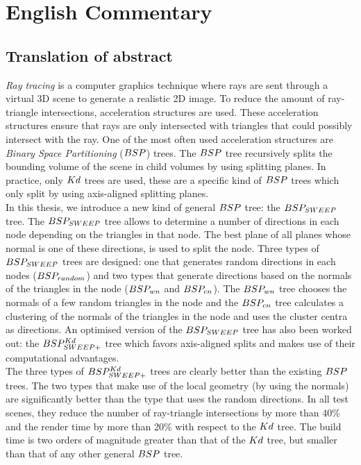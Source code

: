 \chapter{English Commentary}

\section{Translation of abstract}
\textit{Ray tracing} is a computer graphics technique where rays are sent through a virtual 3D scene to generate a realistic 2D image.
To reduce the amount of ray-triangle intersections, acceleration structures are used.
These acceleration structures ensure that rays are only intersected with triangles that could possibly intersect with the ray.
One of the most often used acceleration structures are \textit{Binary Space Partitioning} ($BSP$) trees.
The $BSP$ tree recursively splits the bounding volume of the scene in child volumes by using splitting planes.
In practice, only $Kd$ trees are used, these are a specific kind of $BSP$ trees which only split by using axis-aligned splitting planes.\\

In this thesis, we introduce a new kind of general $BSP$ tree: the $BSP_{SWEEP}$ tree.
The $BSP_{SWEEP}$ tree allows to determine a number of directions in each node depending on the triangles in that node.  
The best plane of all planes whose normal is one of these directions, is used to split the node.
Three types of $BSP_{SWEEP}$ trees are designed: one that generates random directions in each nodes ($BSP_{random}$) and two types that generate directions based on the normals of the triangles in the node ($BSP_{wn}$ and $BSP_{cn}$).
The $BSP_{wn}$  tree chooses the normals of a few random triangles in the node and the $BSP_{cn}$  tree calculates a clustering of the normals of the triangles in the node and uses the cluster centra as directions.
An optimised version of the $BSP_{SWEEP}$ tree has also been worked out: the $BSP^{Kd}_{SWEEP+}$ tree which favors axis-aligned splits and makes use of their computational advantages.\\

The three types of $BSP^{Kd}_{SWEEP+}$ trees are clearly better than the existing $BSP$ trees.
The two types that make use of the local geometry (by using the normals) are significantly better than the type that uses the random directions.
In all test scenes, they reduce the number of ray-triangle intersections by more than 40\% and the render time by more than 20\% with respect to the $Kd$ tree. The build time is two orders of magnitude greater than that of the $Kd$ tree, but smaller than that of any other general $BSP$ tree.

